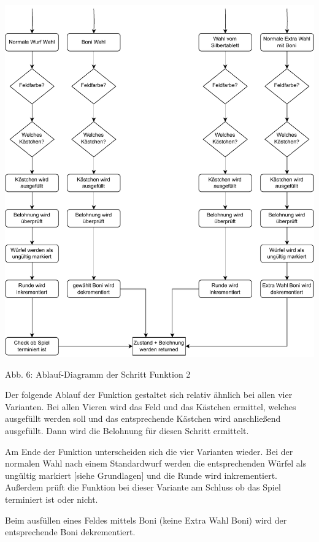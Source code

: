 \begin{minipage}{\linewidth}

	\vspace{0.5cm}
	\includegraphics[width=1\textwidth]{Bilder/step2.drawio}
	
	Abb. 6: Ablauf-Diagramm der Schritt Funktion 2 \\
\end{minipage}

Der folgende Ablauf der Funktion gestaltet sich relativ ähnlich bei allen vier Varianten. Bei allen Vieren wird das Feld und das Kästchen ermittel, welches ausgefüllt werden soll und das entsprechende Kästchen wird anschließend ausgefüllt. Dann wird die Belohnung für diesen Schritt ermittelt.

Am Ende der Funktion unterscheiden sich die vier Varianten wieder. Bei der normalen Wahl nach einem Standardwurf werden die entsprechenden Würfel als ungültig markiert [siehe Grundlagen] und die Runde wird inkrementiert. Außerdem prüft die Funktion bei dieser Variante am Schluss ob das Spiel terminiert ist oder nicht.

Beim ausfüllen eines Feldes mittels Boni (keine Extra Wahl Boni) wird der entsprechende Boni dekrementiert.

